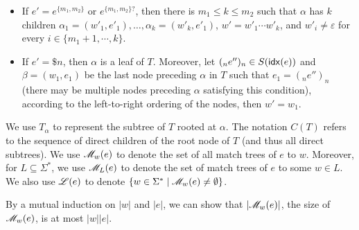 \begin{definition}
\begin{itemize}
  		\item If $e' = e^{\{m_1, m_2\}}$ or $e^{\{m_1, m_2\}?}$, then there is $m_1 \leqslant k \leqslant m_2$ such that $\alpha$ has $k$ children $\alpha_1 = (w'_1, e'_1), \ldots, \alpha_k = (w'_k, e'_1)$, $w' = w'_1 \cdots w'_k$, and $w'_i \neq \varepsilon$ for every $i \in \{m_1 + 1, \cdots, k\}$.
%
		\item If $e' = \$n$, then $\alpha$ is a leaf of $T$. 
		Moreover, let $(_n e'' )_n \in S({\sf idx}(e))$ and $\beta = (w_1, e_1)$ be the last node preceding $\alpha$ in $T$ such that $e_1 = (_n e'')_n$ (there may be multiple nodes preceding $\alpha$ satisfying this condition), 
		according to the left-to-right ordering of the nodes, then $w' = w_1$.
  	\end{itemize}
  	
 We use $T_\alpha$ to represent the subtree of $T$ rooted at $\alpha$.
The notation $C(T)$ refers to the sequence of direct children of the root node of $T$ (and thus all direct subtrees).
%
We use $\mathscr{M}_{w}(e)$ to denote the set of all match trees of $e$ to $w$. Moreover, for $L \subseteq \Sigma^\ast$, we use $\mathscr{M}_{L}(e)$ to denote the set of match trees of $e$ to some $w \in L$.
We also use $\mathscr{L}(e)$ to denote $\{w \in \Sigma^* \mid \mathscr{M}_w(e) \neq \emptyset\}$. 
  \end{definition}
By a mutual induction on $|w|$ and $|e|$, we can show that $|\mathscr{M}_{w}(e)|$, the size of $\mathscr{M}_{w}(e)$, is at most $|w||e|$.  
  
